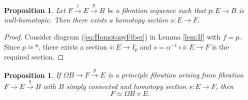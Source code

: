 \documentclass{article}
\theoremstyle{plain}
\newtheorem{prop}[thm]{Proposition}
\theoremstyle{definition}
\numberwithin{thm}{section}
\begin{document}
		\begin{prop}\label{prop:FibeTrival}
			Let $F\xrightarrow{i}E\xrightarrow{p}B$ be a fibration sequence such that $p\colon E\to B$ is null-homotopic.
			Then there exists a homotopy section $s\colon E \to F$.
		\end{prop}
		
		\begin{proof}
			Consider diagram (\ref{eq:HomotopyFiber}) in Lemma \ref{lem:If} with $f=p$.
			Since $p\simeq *$, there exists a section $\bar{s}\colon E \to I_p$ and $s=\alpha^{-1}\circ \bar{s}\colon E \to F$ is the required section. 
		\end{proof}
		
		
		\begin{prop}\label{prop:FibeSection}
			If $\Omega{B}\to F \xrightarrow{p} E$ is a principle fibration arising from fibration $F\to E\xrightarrow{q} B$ with $B$ simply connected
			and homotopy section $s \colon E \to F$, then 
			\begin{equation*}
				F\simeq \Omega B \times E.
			\end{equation*}
		\end{prop}
		
\end{document}
